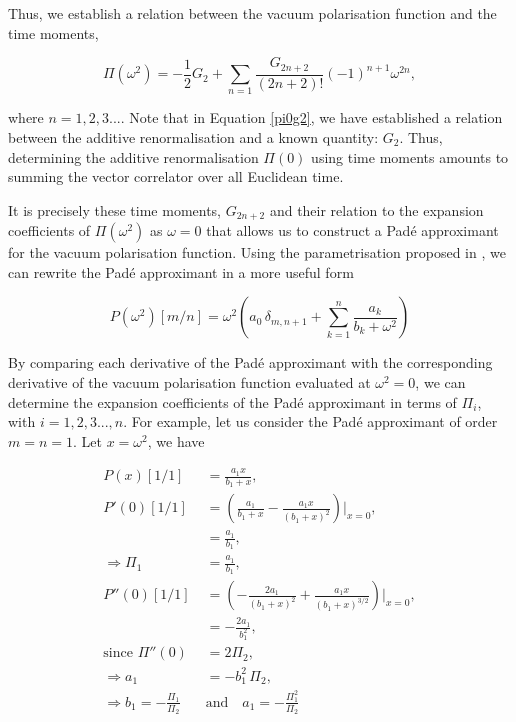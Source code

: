 \documentclass{article}
\numberwithin{equation}{section} %
\begin{document}
Thus, we establish a relation between the vacuum polarisation function and the time moments,

\begin{equation}
\Pi(\omega^2) = -\frac{1}{2}G_2 + \sum_{n=1} \frac{G_{2n+2}}{(2n+2)!}(-1)^{n+1} \omega^{2n},
\label{pi in terms of time moments}
\end{equation}

\noindent where $n=1,2,3...$. Note that in Equation \ref{pi0g2}, we have established a relation between the additive renormalisation and a known quantity: $G_2$. Thus, determining the additive renormalisation $\Pi(0)$ using time moments amounts to summing the vector correlator over all Euclidean time. 

It is precisely these time moments, $G_{2n+2}$ and their relation to the expansion coefficients of $\Pi(\omega^2)$ as $\omega=0$ that allows us to construct a Pad\'e approximant for the vacuum polarisation function. Using the parametrisation proposed in \cite{pade2}, we can rewrite the Pad\'e approximant in a more useful form 

\begin{equation}
P(\omega^2)[m/n] = \omega^2\left( a_0\,\delta_{m,n+1} + \sum_{k=1}^n \frac{a_k}{b_k + \omega^2} \right)
\label{pade new}
\end{equation}

By comparing each derivative of the Pad\'e approximant with the corresponding derivative of the vacuum polarisation function evaluated at $\omega^2=0$, we can determine the expansion coefficients of the Pad\'e approximant in terms of $\Pi_i$, with $i=1,2,3...,n$. For example, let us consider the Pad\'e approximant of order $m=n=1$. Let $x=\omega^2$, we have 

\begin{equation}
\begin{split}
P(x)[1/1] &= \frac{a_1x}{b_1+x},\\
P'(0)[1/1]&= \left(\frac{a_1}{b_1+x} - \frac{a_1x}{(b_1+x)^2}\right)\bigg\vert_{x=0},\\
&= \frac{a_1}{b_1},\\
\Rightarrow \Pi_1 &= \frac{a_1}{b_1},\\
P''(0)[1/1]&= \left(-\frac{2a_1}{(b_1+x)^2} + \frac{a_1x}{(b_1+x)^{3/2}}\right)\bigg\vert_{x=0},\\
&=-\frac{2a_1}{b_1^2},\\
\mathrm{since}\,\,\Pi''(0) &= 2\Pi_2,\\
\Rightarrow a_1 &= -b_1^2\,\Pi_2,\\
\Rightarrow b_1 = -\frac{\Pi_1}{\Pi_2} \quad &\mathrm{and} \quad a_1 = -\frac{\Pi_1^2}{\Pi_2}
\end{split}
\end{equation}
\end{document}
